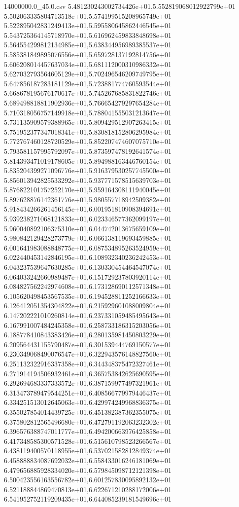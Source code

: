 \begin{filecontents*}{14000000.0_45.0.csv}
5.481230243002734426e+01,5.552819068012922799e+01
5.502063335804713518e+01,5.574199515208965749e+01
5.522895042831249413e+01,5.595580645862446545e+01
5.543725364145718970e+01,5.616962459833848698e+01
5.564554299812134985e+01,5.638344956989385537e+01
5.585381849895076556e+01,5.659728137192814756e+01
5.606208014457637034e+01,5.681112000310986332e+01
5.627032793564605129e+01,5.702496546209749795e+01
5.647856187283181129e+01,5.723881774760593544e+01
5.668678195676170617e+01,5.745267685831822746e+01
5.689498818811902936e+01,5.766654279297654284e+01
5.710318056757149918e+01,5.788041555031213647e+01
5.731135909579388965e+01,5.809429512907263415e+01
5.751952377347018341e+01,5.830818152806295984e+01
5.772767460128720529e+01,5.852207474607075710e+01
5.793581157995792097e+01,5.873597478192641574e+01
5.814393471019178605e+01,5.894988163446760154e+01
5.835204399271096776e+01,5.916379530257745500e+01
5.856013942825533292e+01,5.937771578515639703e+01
5.876822101757252170e+01,5.959164308111940045e+01
5.897628876142361776e+01,5.980557718942509382e+01
5.918434266261456145e+01,6.001951810908394691e+01
5.939238271068121833e+01,6.023346577362099197e+01
5.960040892106375310e+01,6.044742013675659109e+01
5.980842129428273779e+01,6.066138119693459885e+01
6.001641983088848775e+01,6.087534895263524959e+01
6.022440453142846195e+01,6.108932340236242453e+01
6.043237539647630285e+01,6.130330454464547074e+01
6.064033242660989487e+01,6.151729237803920114e+01
6.084827562242974608e+01,6.173128690112571348e+01
6.105620498453567535e+01,6.194528811252166633e+01
6.126412051354304822e+01,6.215929601088009804e+01
6.147202221010260814e+01,6.237331059485495643e+01
6.167991007484245358e+01,6.258733186315203056e+01
6.188778410843383426e+01,6.280135981450803229e+01
6.209564431155790487e+01,6.301539444769150577e+01
6.230349068490076547e+01,6.322943576148827560e+01
6.251132322916337358e+01,6.344348375472327461e+01
6.271914194506932461e+01,6.365753842625690595e+01
6.292694683337333572e+01,6.387159977497321961e+01
6.313473789479544251e+01,6.408566779979446437e+01
6.334251513012645063e+01,6.429974249968836375e+01
6.355027854014439725e+01,6.451382387362355075e+01
6.375802812565496680e+01,6.472791192063232302e+01
6.396576388747011777e+01,6.494200663976425858e+01
6.417348585300571528e+01,6.515610798523266567e+01
6.438119400570118955e+01,6.537021582812849374e+01
6.458888834087692032e+01,6.558433016246181069e+01
6.479656885928334020e+01,6.579845098712121398e+01
6.500423556163556782e+01,6.601257830095892132e+01
6.521188844869470813e+01,6.622671210288172006e+01
6.541952752119209435e+01,6.644085239181549696e+01

\end{filecontents*}
